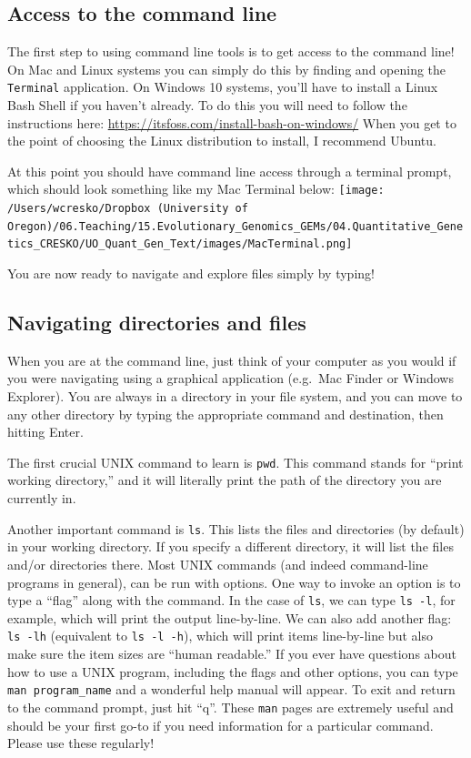 \documentclass[
]{book}
\begin{document}
\hypertarget{access-to-the-command-line}{%
\subsection{Access to the command line}\label{access-to-the-command-line}}

The first step to using command line tools is to get access to the command line! On Mac and Linux systems you can simply do this by finding and opening the \texttt{Terminal} application. On Windows 10 systems, you'll have to install a Linux Bash Shell if you haven't already. To do this you will need to follow the instructions here: \url{https://itsfoss.com/install-bash-on-windows/}
When you get to the point of choosing the Linux distribution to install, I recommend Ubuntu.

At this point you should have command line access through a terminal prompt, which should look something like my Mac Terminal below:
\texttt{[image: /Users/wcresko/Dropbox (University of Oregon)/06.Teaching/15.Evolutionary\_Genomics\_GEMs/04.Quantitative\_Genetics\_CRESKO/UO\_Quant\_Gen\_Text/images/MacTerminal.png]}

You are now ready to navigate and explore files simply by typing!

\hypertarget{navigating-directories-and-files}{%
\subsection{Navigating directories and files}\label{navigating-directories-and-files}}

When you are at the command line, just think of your computer as you would if you were navigating using a graphical application (e.g.~Mac Finder or Windows Explorer). You are always in a directory in your file system, and you can move to any other directory by typing the appropriate command and destination, then hitting Enter.

The first crucial UNIX command to learn is \texttt{pwd}. This command stands for ``print working directory,'' and it will literally print the path of the directory you are currently in.

Another important command is \texttt{ls}. This lists the files and directories (by default) in your working directory. If you specify a different directory, it will list the files and/or directories there. Most UNIX commands (and indeed command-line programs in general), can be run with options. One way to invoke an option is to type a ``flag'' along with the command. In the case of \texttt{ls}, we can type \texttt{ls\ -l}, for example, which will print the output line-by-line. We can also add another flag: \texttt{ls\ -lh} (equivalent to \texttt{ls\ -l\ -h}), which will print items line-by-line but also make sure the item sizes are ``human readable.'' If you ever have questions about how to use a UNIX program, including the flags and other options, you can type \texttt{man\ program\_name} and a wonderful help manual will appear. To exit and return to the command prompt, just hit ``q''. These \texttt{man} pages are extremely useful and should be your first go-to if you need information for a particular command. Please use these regularly!
\end{document}
